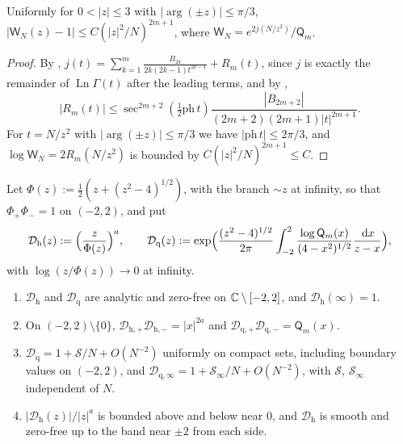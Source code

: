 \begin{lemma}\label{lem:pone-stirling}
Uniformly for $0<|z|\le3$ with $|\arg(\pm z)|\le\pi/3$,
$|\mathsf W_N(z)-1|\le C(|z|^2/N)^{2m+1}$, where $\mathsf W_N=e^{2j(N/z^2)}/\mathsf Q_m$.
\end{lemma}

\begin{proof}
By \cite[(5.11.1)]{DLMF}, $j(t)=\sum_{k=1}^m\frac{B_{2k}}{2k(2k-1)t^{2k-1}}+R_m(t)$, since $j$ is exactly the remainder of
$\operatorname{Ln}\Gamma(t)$ after the leading terms, and by \cite[\S5.11(ii)]{DLMF},
\[
  |R_m(t)|\le\sec^{2m+2}(\tfrac12\mathrm{ph}\,t)\frac{|B_{2m+2}|}{(2m+2)(2m+1)|t|^{2m+1}}.
\]
For $t=N/z^2$ with
$|\arg(\pm z)|\le\pi/3$ we have $|\mathrm{ph}\,t|\le2\pi/3$, and $\log\mathsf W_N=2R_m(N/z^2)$ is bounded by
$C(|z|^2/N)^{2m+1}\le C$.
\end{proof}

Let $\Phi(z):=\frac12(z+(z^2-4)^{1/2})$, with the branch $\sim z$ at infinity, so that $\Phi_+\Phi_-=1$ on $(-2,2)$, and put
\[
  \mathcal D_{\mathrm h}(z):=\Bigl(\frac z{\Phi(z)}\Bigr)^{a},\qquad
  \mathcal D_{\mathrm q}(z):=\exp\Bigl(\frac{(z^2-4)^{1/2}}{2\pi}\int_{-2}^2\frac{\log\mathsf Q_m(x)}{(4-x^2)^{1/2}}\frac{\,\mathrm{d} x}{z-x}\Bigr),
\]
with $\log(z/\Phi(z))\to0$ at infinity.

\begin{lemma}\label{lem:pone-szego}
\begin{enumerate}
\item[(i)] $\mathcal D_{\mathrm h}$ and $\mathcal D_{\mathrm q}$ are analytic and zero-free on $\mathbb{C}\setminus[-2,2]$, and
  $\mathcal D_{\mathrm h}(\infty)=1$.
\item[(ii)] On $(-2,2)\setminus\{0\}$, $\mathcal D_{\mathrm h,+}\mathcal D_{\mathrm h,-}=|x|^{2a}$ and $\mathcal D_{\mathrm q,+}\mathcal D_{\mathrm q,-}=\mathsf Q_m(x)$.
\item[(iii)] $\mathcal D_{\mathrm q}=1+\mathcal S/N+O(N^{-2})$ uniformly on compact sets, including boundary values on
  $(-2,2)$, and $\mathcal D_{\mathrm q,\infty}=1+\mathcal S_\infty/N+O(N^{-2})$, with $\mathcal S$, $\mathcal S_\infty$ independent of
  $N$.
\item[(iv)] $|\mathcal D_{\mathrm h}(z)|/|z|^a$ is bounded above and below near $0$, and $\mathcal D_{\mathrm h}$ is smooth and
  zero-free up to the band near $\pm2$ from each side.
\end{enumerate}
\end{lemma}

